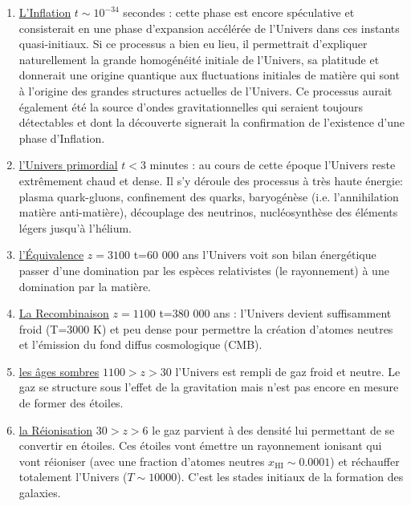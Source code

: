 \begin{enumerate}
\item \underline{L'Inflation} $t\sim 10^{-34}$ secondes :  cette phase est encore spéculative et consisterait en une phase d'expansion accélérée de l'Univers dans ces instants quasi-initiaux. Si ce processus a bien eu lieu, il permettrait d'expliquer naturellement la grande homogénéité initiale de l'Univers, sa platitude et donnerait une origine quantique aux fluctuations initiales de matière qui sont à l'origine des grandes structures actuelles de l'Univers. Ce processus aurait également été la source d'ondes gravitationnelles qui seraient toujours détectables et dont la découverte signerait la confirmation de l'existence d'une phase d'Inflation.
\item \underline{l'Univers primordial} $t<3$ minutes : au cours de cette époque l'Univers reste extrêmement chaud et dense. Il s'y déroule des processus à très haute énergie: plasma quark-gluons, confinement des quarks, baryogénèse (i.e. l'annihilation matière anti-matière), découplage des neutrinos, nucléosynthèse des éléments légers jusqu'à l'hélium.
\item \underline{l'Équivalence} $z=3100$ t=60 000 ans  l'Univers voit son bilan énergétique passer d'une domination par les espèces relativistes (le rayonnement) à une domination par la matière.
\item \underline{La Recombinaison} $z=1100$ t=380 000 ans : l'Univers devient suffisamment froid (T=3000 K) et peu dense pour permettre la création d'atomes neutres et l'émission du fond diffus cosmologique (CMB). 
\item \underline{les âges sombres} $1100>z>30$  l'Univers est rempli de gaz froid et neutre. Le gaz se structure sous l'effet de la gravitation mais  n'est pas encore en mesure de former des étoiles. 
\item \underline{la Réionisation} $30>z>6$ le gaz parvient à des densité lui permettant de se convertir en étoiles. Ces étoiles vont émettre un rayonnement ionisant qui vont réioniser (avec une fraction d'atomes neutres $x_\mathrm{HI}\sim0.0001$) et réchauffer totalement l'Univers ($T\sim 10000$). C'est les stades initiaux de la formation des galaxies.

\end{enumerate}
